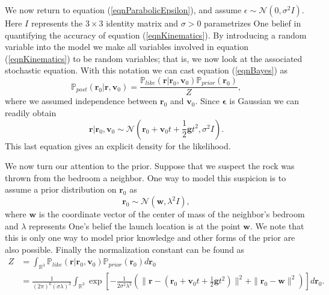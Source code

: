\documentclass[12pt]{book}
\newcommand{\post}{\mathbb{P}_{post}}
\newcommand{\like}{\mathbb{P}_{like}}
\newcommand{\prior}{\mathbb{P}_{prior}}
\newcommand{\p}{\mathbb{P}}
\begin{document}
We now return to equation (\ref{eqnParabolicEpsilon}), and assume $\epsilon\sim\mathcal{N}(0,\sigma^{2}I)$.
Here $I$
represents the $3\times 3$ identity matrix and $\sigma>0$ parametrizes One belief in quantifying the 
accuracy  
of equation (\ref{eqnKinematics}).  By introducing a random variable into the model
we make all variables involved  in equation (\ref{eqnKinematics})
to be  random variables; that is, we now look at the  associated stochastic equation. With this notation
we can cast equation (\ref{eqnBayes}) as  
\begin{equation}\label{eqnpostrock}
\post(\textbf{r}_{0}|\textbf{r},\textbf{v}_{0})=\frac{\like(\textbf{r}|\textbf{r}_{0},\textbf{v}_{0})
\prior(\textbf{r}_{0})}{Z},
\end{equation}
where we assumed independence between $\textbf{r}_{0}$ and $\textbf{v}_{0}$.
Since $\mathbf{\epsilon}$ is Gaussian we can readily obtain \cite{Somersalo}
\begin{equation*}
\textbf{r}|\textbf{r}_{0},\textbf{v}_{0}\sim \mathcal{N}(\textbf{r}_{0}+\textbf{v}_{0}t+\frac{1}{2}\textbf{g}t^{2}
,\sigma^{2} I).
\end{equation*}
This last equation gives an explicit density for the likelihood. 

We now turn our attention to  the prior.
Suppose that we suspect the rock was thrown from the bedroom a neighbor.
 One way to model this suspicion is to assume a prior distribution on $\textbf{r}_{0}$ as
\begin{equation*}
\textbf{r}_{0}\sim\mathscr{N}(\textbf{w},\lambda^{2} I),
\end{equation*}
where $\textbf{w}$ is the coordinate vector of the center of mass of the neighbor's bedroom and $\lambda$ represents 
One's belief the launch location is at the point $\textbf{w}$. We note that  this is only one way to model 
 prior knowledge and other forms of the prior are also possible. Finally the normalization constant
can be found as
\begin{align*}
Z&=\int_{\mathbb{R}^{3}}\like(\textbf{r}|\textbf{r}_{0},\textbf{v}_{0})
\prior(\textbf{r}_{0})d\textbf{r}_{0}\\
&= \frac{1}{(2\pi)^{6}(\sigma\lambda)^{3}}\int_{\mathbb{R}^{3}}
\exp\left[-\frac{1}{2\sigma^{2}\lambda^{2}}
\left(\|\textbf{r}-(\textbf{r}_{0}+\textbf{v}_{0}t+\frac{1}{2}\textbf{g}t^{2})\|^{2}
+\|\textbf{r}_{0}-\textbf{w}\|^{2}\right)\right]d\textbf{r}_{0}.
\end{align*}
\end{document}
